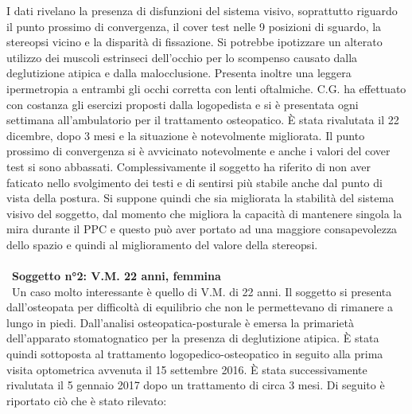 I dati rivelano la presenza di disfunzioni del sistema visivo, soprattutto riguardo il punto prossimo di convergenza, il cover test nelle 9 posizioni di sguardo, la stereopsi vicino e la disparità di fissazione. Si potrebbe ipotizzare un alterato utilizzo dei muscoli estrinseci dell’occhio per lo scompenso causato dalla deglutizione atipica e dalla malocclusione. Presenta inoltre una leggera ipermetropia a entrambi gli occhi corretta con lenti oftalmiche. C.G. ha effettuato con costanza gli esercizi proposti dalla logopedista e si è presentata ogni settimana all’ambulatorio per il trattamento osteopatico. È stata rivalutata il 22 dicembre, dopo 3 mesi e la situazione è notevolmente migliorata. Il punto prossimo di convergenza si è avvicinato notevolmente e anche i valori del cover test si sono abbassati. Complessivamente il soggetto ha riferito di non aver faticato nello svolgimento dei testi e di sentirsi più stabile anche dal punto di vista della postura. Si suppone quindi che sia migliorata la stabilità del sistema visivo del soggetto, dal momento che migliora la capacità di mantenere singola la mira durante il PPC e questo può aver portato ad una maggiore consapevolezza dello spazio e quindi al miglioramento del valore della stereopsi.
\\\ \\\
\textbf{Soggetto n°2: V.M. 22 anni, femmina}
\\\
Un caso molto interessante è quello di V.M. di 22 anni. Il soggetto si presenta dall’osteopata per difficoltà di equilibrio che non le permettevano di rimanere a lungo in piedi. Dall’analisi osteopatica-posturale è emersa la primarietà dell’apparato stomatognatico per la presenza di deglutizione atipica. È stata quindi sottoposta al trattamento logopedico-osteopatico in seguito alla prima visita optometrica avvenuta il 15 settembre 2016. È stata successivamente rivalutata il 5 gennaio 2017 dopo un trattamento di circa 3 mesi. Di seguito è riportato ciò che è stato rilevato:

